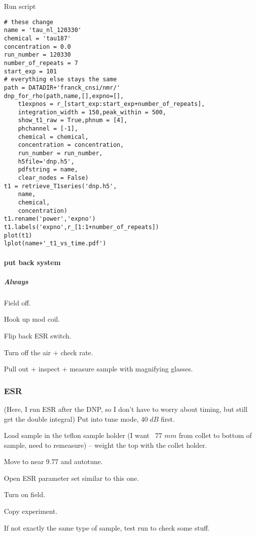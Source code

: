 Run script

\begin{scriptsize}
\begin{lstlisting}
# these change
name = 'tau_nl_120330'
chemical = 'tau187'
concentration = 0.0
run_number = 120330
number_of_repeats = 7
start_exp = 101
# everything else stays the same
path = DATADIR+'franck_cnsi/nmr/'
dnp_for_rho(path,name,[],expno=[],
    t1expnos = r_[start_exp:start_exp+number_of_repeats],
    integration_width = 150,peak_within = 500,
    show_t1_raw = True,phnum = [4],
    phchannel = [-1],
    chemical = chemical,
    concentration = concentration,
    run_number = run_number,
    h5file='dnp.h5',
    pdfstring = name,
    clear_nodes = False)
t1 = retrieve_T1series('dnp.h5',
    name,
    chemical,
    concentration)
t1.rename('power','expno')
t1.labels('expno',r_[1:1+number_of_repeats])
plot(t1)
lplot(name+'_t1_vs_time.pdf')
\end{lstlisting}
\end{scriptsize}
\paragraph{put back system}
\subparagraph{Always}
Field off.

Hook up mod coil.

Flip back ESR switch.

Turn off the air + check rate.

Pull out + inspect + measure sample with magnifying glasses.

\subsubsection{ESR}

(Here, I run ESR after the DNP, so I don't have to worry about timing, but still get the double integral)
Put into tune mode, $40\;dB$ first.

Load sample in the teflon sample holder (I want ~77 $mm$ from collet to bottom of sample, need to remeasure) -- weight the top with the collet holder.

Move to near 9.77 and autotune.

Open ESR parameter set similar to this one.

Turn on field.

Copy experiment.

If not exactly the same type of sample, test run to check some stuff.

